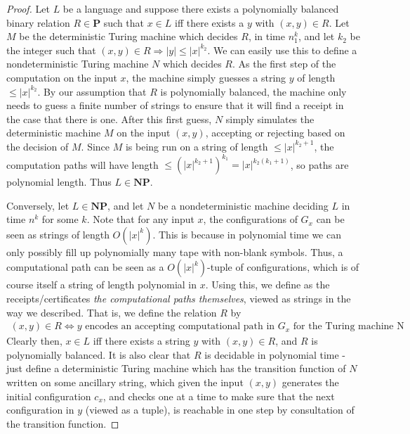 \begin{proof}
    Let $L$ be a language and suppose there exists a polynomially balanced binary relation $R \in \textbf{P}$ such that $x \in L$ iff there exists a $y$ with $(x,y) \in R$. Let $M$ be the deterministic Turing machine which decides $R$, in time $n^k_1$, and let $k_2$ be the integer such that $(x,y) \in R \Rightarrow |y| \leq |x|^{k_2}$. We can easily use this to define a nondeterministic Turing machine $N$ which decides $R$. As the first step of the computation on the input $x$, the machine simply guesses a string $y$ of length $\leq |x|^{k_2}$. By our assumption that $R$ is polynomially balanced, the machine only needs to guess a finite number of strings to ensure that it will find a receipt in the case that there is one. After this first guess, $N$ simply simulates the deterministic machine $M$ on the input $(x,y)$, accepting or rejecting based on the decision of $M$. Since $M$ is being run on a string of length $\leq |x|^{k_2+1}$, the computation paths will have length $\leq (|x|^{k_2+1})^{k_1} = |x|^{k_2(k_1+1)}$, so paths are polynomial length. Thus $L \in \textbf{NP}$. 
    \par Conversely, let $L \in \textbf{NP}$, and let $N$ be a nondeterministic machine deciding $L$ in time $n^k$ for some $k$. Note that for any input $x$, the configurations of $G_x$ can be seen as strings of length $O(|x|^k)$. This is because in polynomial time we can only possibly fill up polynomially many tape with non-blank symbols. Thus, a computational path can be seen as a $O(|x|^k)$-tuple of configurations, which is of course itself a string of length polynomial in $x$. Using this, we define as the receipts/certificates \textit{the computational paths themselves}, viewed as strings in the way we described. That is, we define the relation $R$ by
    \begin{align}
        (x,y) \in R \iff \textrm{$y$ encodes an accepting computational path in $G_x$ for the Turing machine N}
    \end{align}
    Clearly then, $x \in L$ iff there exists a string $y$ with $(x,y) \in R$, and $R$ is polynomially balanced. It is also clear that $R$ is decidable in polynomial time - just define a deterministic Turing machine which has the transition function of $N$ written on some ancillary string, which given the input $(x,y)$ generates the initial configuration $c_x$, and checks one at a time to make sure that the next configuration in $y$ (viewed as a tuple), is reachable in one step by consultation of the transition function. 
\end{proof}
